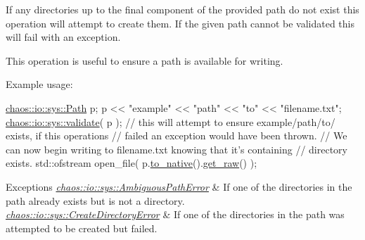 If any directories up to the final component of the provided path do not exist this operation will attempt to create them. If the given path cannot be validated this will fail with an exception.

This operation is useful to ensure a path is available for writing.

Example usage\+:


\begin{DoxyCode}
\hyperlink{classchaos_1_1io_1_1sys_1_1_path}{chaos::io::sys::Path} p;
p << \textcolor{stringliteral}{"example"} << \textcolor{stringliteral}{"path"} << \textcolor{stringliteral}{"to"} << \textcolor{stringliteral}{"filename.txt"};
\hyperlink{namespacechaos_1_1io_1_1sys_a15e20b105c40cf4d73b13afe87ce1781}{chaos::io::sys::validate}( p );
\textcolor{comment}{// this will attempt to ensure example/path/to/ exists, if this operations}
\textcolor{comment}{// failed an exception would have been thrown.}
\textcolor{comment}{// We can now begin writing to filename.txt knowing that it's containing}
\textcolor{comment}{// directory exists.}
std::ofstream open\_file( p.\hyperlink{classchaos_1_1io_1_1sys_1_1_path_adb68b7589d18dc78f19d9dd6936d9833}{to\_native}().\hyperlink{classchaos_1_1uni_1_1_u_t_f8_string_a91d3bb4cfbfb573b3fa6ecf3312f4dee}{get\_raw}() );
\end{DoxyCode}



\begin{DoxyExceptions}{Exceptions}
{\em \hyperlink{classchaos_1_1io_1_1sys_1_1_ambiguous_path_error}{chaos\+::io\+::sys\+::\+Ambiguous\+Path\+Error}} & If one of the directories in the path already exists but is not a directory. \\
\hline
{\em \hyperlink{classchaos_1_1io_1_1sys_1_1_create_directory_error}{chaos\+::io\+::sys\+::\+Create\+Directory\+Error}} & If one of the directories in the path was attempted to be created but failed. \\
\hline
\end{DoxyExceptions}
